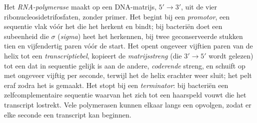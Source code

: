 \begin{definition}\label{def:b1:gene-expression:transcription}
Het \emph{RNA-polymerase} maakt  op een DNA-matrijs, $5' \to 3'$, uit de vier
ribonucleosidetrifosfaten, zonder primer. Het begint bij een \emph{promotor}, een
sequentie vlak vóór het  die het herkent en bindt; bij bacteriën doet een
subeenheid die $\sigma$ (\emph{sigma}) heet het herkennen, bij twee geconserveerde
stukken tien en vijfendertig paren vóór de start. Het  opent ongeveer vijftien
paren van de helix tot een \emph{transcriptiebel}, kopieert de \emph{matrijsstreng}
(die $3' \to 5'$ wordt gelezen) tot een  dat in sequentie gelijk is aan de
andere, \emph{coderende} streng, en schuift op met ongeveer vijftig  per
seconde, terwijl het de helix erachter weer sluit; het  pelt eraf zodra het is
gemaakt. Het stopt bij een \emph{terminator}: bij bacteriën een
zelfcomplementaire sequentie waarvan het  zich tot een haarspeld vouwt die het
transcript lostrekt. Vele polymerasen kunnen elkaar langs een  opvolgen, zodat
er elke seconde een transcript kan beginnen.
\end{definition}

